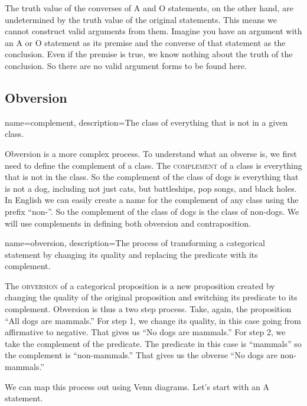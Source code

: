 The truth value of the converses of A and O statements, on the other hand, are undetermined by the truth value of the original statements. This means we cannot construct valid arguments from them. Imagine you have an argument with an A or O statement as its premise and the converse of that statement as the conclusion. Even if the premise is true, we know nothing about the truth of the conclusion. So there are no valid argument forms to be found here.

\subsection{Obversion}

{
name=complement,
description={The class of everything that is not in a given class.}
}


Obversion is a more complex process. To understand what an obverse is, we first need to define the complement of a class. The \textsc{\gls{complement}} \label{def:Complement} of a class is everything that is not in the class. So the complement of the class of dogs is everything that is not a dog, including not just cats, but battleships, pop songs, and black holes. In English we can easily create a name for the complement of any class using the prefix ``non-''. So the complement of the class of dogs is the class of non-dogs. We will use complements in defining both obversion and contraposition.

{
name=obversion,
description={The process of transforming a categorical statement by changing its quality and replacing the predicate with its complement.}
}


The \textsc{\gls{obversion}} \label{def:Obversion} of a categorical proposition is a new proposition created by changing the quality of the original proposition and switching its predicate to its complement. Obversion is thus a two step process. Take, again, the proposition ``All dogs are mammals.'' For step 1, we change its quality, in this case going from affirmative to negative. That gives us ``No dogs are mammals.'' For step 2, we take the complement of the predicate. The predicate in this case is ``mammals'' so the complement is ``non-mammals.'' That gives us the obverse ``No dogs are non-mammals.''

We can map this process out using Venn diagrams. Let's start with an A statement.

